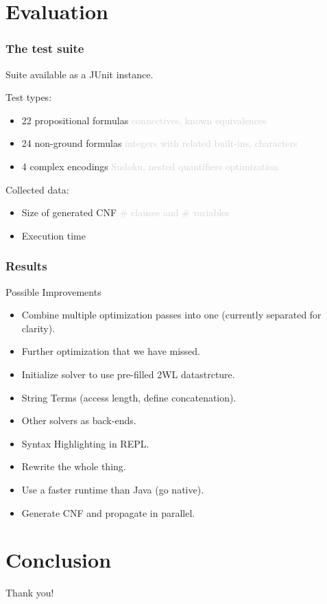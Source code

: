 \documentclass[smaller,dvipsnames,ratio=169]{beamer}
\begin{document}
  \section{Evaluation}

  \begin{frame}
    \frametitle{The test suite}
    Suite available as a \alert{JUnit} instance.

    Test types:
    \begin{itemize}
      \item 22 propositional formulas \textcolor{lightgray}{connectives, known equivalences}
      \item 24 non-ground formulas \textcolor{lightgray}{integers with related built-ins, characters}
      \item 4 complex encodings \textcolor{lightgray}{Sudoku, nested quantifiers optimization}
    \end{itemize}
    Collected data:
    \begin{itemize}
      \item \alert{Size} of generated CNF \textcolor{lightgray}{\# clauses and \# variables}
      \item Execution \alert{time}
    \end{itemize}
  \end{frame}

  \begin{frame}
    \frametitle{Results}
  \end{frame}

  \begin{frame}{Possible Improvements}
  	\begin{itemize}
  		\item Combine multiple optimization passes into one (currently separated for clarity).
  		\item Further optimization that we have missed.
  		\item Initialize solver to use pre-filled 2WL datastrcture.
  		\item String Terms (access length, define concatenation).
  		\item Other solvers as back-ends.
  		\item Syntax Highlighting in REPL.
  		\item Rewrite the whole thing.
  		\item Use a faster runtime than Java (go native).
  		\item Generate CNF and propagate in parallel.
  	\end{itemize}
  \end{frame}

  \section{Conclusion}


  \begin{frame}[standout]
    Thank you!
  \end{frame}
\end{document}
